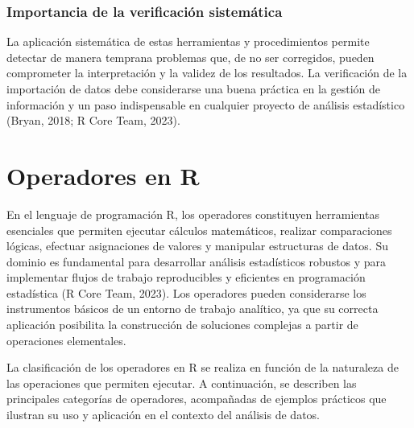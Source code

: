 \documentclass[
  spanish,
  a4paper,
  DIV=11,
  numbers=noendperiod,
  onepage,
  openany]{scrreprt}
\begin{document}
\subsection{Importancia de la verificación
sistemática}\label{importancia-de-la-verificaciuxf3n-sistemuxe1tica}

La aplicación sistemática de estas herramientas y procedimientos permite
detectar de manera temprana problemas que, de no ser corregidos, pueden
comprometer la interpretación y la validez de los resultados. La
verificación de la importación de datos debe considerarse una buena
práctica en la gestión de información y un paso indispensable en
cualquier proyecto de análisis estadístico (Bryan, 2018; R Core Team,
2023).


\chapter{Operadores en R}\label{operadores-en-r}

En el lenguaje de programación R, los operadores constituyen
herramientas esenciales que permiten ejecutar cálculos matemáticos,
realizar comparaciones lógicas, efectuar asignaciones de valores y
manipular estructuras de datos. Su dominio es fundamental para
desarrollar análisis estadísticos robustos y para implementar flujos de
trabajo reproducibles y eficientes en programación estadística (R Core
Team, 2023). Los operadores pueden considerarse los instrumentos básicos
de un entorno de trabajo analítico, ya que su correcta aplicación
posibilita la construcción de soluciones complejas a partir de
operaciones elementales.

La clasificación de los operadores en R se realiza en función de la
naturaleza de las operaciones que permiten ejecutar. A continuación, se
describen las principales categorías de operadores, acompañadas de
ejemplos prácticos que ilustran su uso y aplicación en el contexto del
análisis de datos.
\end{document}
